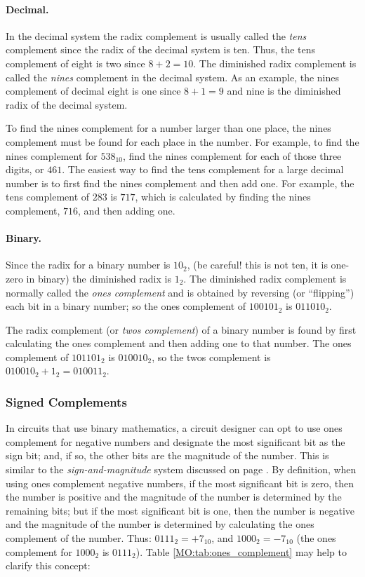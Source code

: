 \paragraph{Decimal.} In the decimal system the radix complement is usually called the \emph{tens} complement since the radix of the decimal system is ten. Thus, the tens complement of eight is two since $ 8 + 2 = 10 $. The diminished radix complement is called the \emph{nines} complement in the decimal system. As an example, the nines complement of decimal eight is one since $ 8 + 1 = 9 $ and nine is the diminished radix of the decimal system. 

To find the nines complement for a number larger than one place, the nines complement must be found for each place in the number. For example, to find the nines complement for $ 538_{10} $, find the nines complement for each of those three digits, or $ 461 $. The easiest way to find the tens complement for a large decimal number is to first find the nines complement and then add one. For example, the tens complement of $ 283 $ is $ 717 $, which is calculated by finding the nines complement, $ 716 $, and then adding one.

\paragraph{Binary.} Since the radix for a binary number is $ 10_2 $, (be careful! this is not ten, it is one-zero in binary) the diminished radix is $ 1_2 $. The diminished radix complement is normally called the \emph{ones complement} and is obtained by reversing (or ``flipping'') each bit in a binary number; so the ones complement of $ 100101_2 $ is $ 011010_2 $. 

The radix complement (or \emph{twos complement}) of a binary number is found by first calculating the ones complement and then adding one to that number. The ones complement of $ 101101_2 $ is $ 010010_2 $, so the twos complement is $ 010010_2 + 1_2 = 010011_2 $.  

\subsubsection{Signed Complements} 
\label{MO:subsub:signed_complement}
In circuits that use binary mathematics, a circuit designer can opt to use ones complement for negative numbers and designate the most significant bit as the sign bit; and, if so, the other bits are the magnitude of the number. This is similar to the \emph{sign-and-magnitude} system discussed on page \pageref{MO:sub:representing_negative_sign_magnitude}. By definition, when using ones complement negative numbers, if the most significant bit is zero, then the number is positive and the magnitude of the number is determined by the remaining bits; but if the most significant bit is one, then the number is negative and the magnitude of the number is determined by calculating the ones complement of the number. Thus: $ 0111_2 = +7_{10} $, and $ 1000_2 = -7_{10} $ (the ones complement for $ 1000_2 $ is $ 0111_2 $). Table \ref{MO:tab:ones_complement} may help to clarify this concept: 

